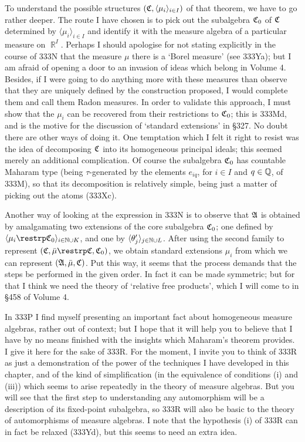 {To understand the possible structures
$(\frak C,\langle\mu_i\rangle_{i\in I})$ of that theorem, we have to go
rather deeper.   The route I have chosen is to pick out the subalgebra
$\frak C_0$ of $\frak C$ determined by $\langle\mu_i\rangle_{i\in I}$
and identify it with the measure algebra of a particular measure on
$\BbbR^I$.   Perhaps I should apologise for not stating explicitly in
the course of 333N that the measure $\mu$ there is a `Borel
measure' (see 333Ya);  but I am afraid of opening a door to an
invasion of ideas which belong in Volume 4.   Besides, if I were going
to do anything more with these measures than observe that they are
uniquely defined by the construction proposed, I would complete them and
call them Radon measures.   In order to validate this approach, I must
show that the $\mu_i$ can be recovered from their restrictions to
$\frak C_0$;  this is 333Md, and is the motive for the discussion of
`standard
extensions' in \S327.   No doubt there are other ways of doing it.
One temptation which I felt it right to resist was the idea of
decomposing $\frak C$ into its homogeneous principal ideals;  this
seemed merely an additional complication.   Of course the subalgebra
$\frak C_0$ has countable Maharam type (being $\tau$-generated by the
elements $e_{iq}$, for $i\in I$ and $q\in\Bbb Q$, of 333M), so that its
decomposition is relatively simple, being just a matter of picking out
the atoms (333Xc).

Another way of looking at the expression in 333N is to observe that
$\frak A$ is obtained by amalgamating two extensions of the core subalgebra
$\frak C_0$;  one defined by
$\langle\mu_i\restrp\frak C_0\rangle_{i\in\Bbb N\cup K}$, and one by
$\langle\theta'_j\rangle_{j\in\Bbb N\cup L}$.   After using the
second family to represent $(\frak C,\bar\mu\restrp\frak C,\frak C_0)$,
we obtain standard extensions $\mu_i$ from which we can represent
$(\frak A,\bar\mu,\frak C)$.   Put this way, it seems that the process
demands that the steps be performed in the given order.
In fact it can be made symmetric;  but for that I think we need the theory
of `relative free products', which I will come to in \S458
of Volume 4.

In 333P I find myself presenting an important fact about homogeneous
measure algebras, rather out of context;  but I hope that it will help
you to believe that I have by no means finished with the insights which
Maharam's theorem provides.   I give it here for the sake of 333R.   For
the moment, I invite you to think of 333R as just a demonstration of the
power of the techniques I have developed in this chapter, and of the
kind of simplification (in the equivalence of conditions (i) and (iii))
which seems to arise repeatedly in the theory of measure algebras.  But
you will see that the first step to understanding any automorphism will
be a description of its fixed-point subalgebra, so 333R will also be
basic to the theory of automorphisms of measure algebras.   I note that
the hypothesis (i) of 333R can in fact be relaxed (333Yd), but this
seems to need an extra idea.
}%

\discrpage

